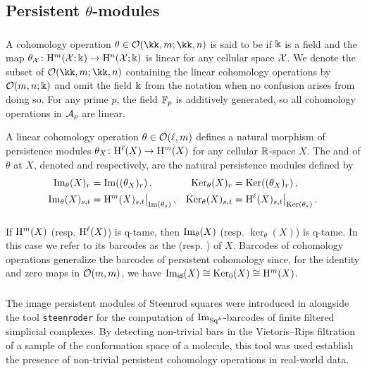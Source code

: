 
\subsection{Persistent $\theta$-modules}

\subsubsection{}\label{ss:theta-modules}

A cohomology operation $\theta \in \cO(\kk,m; \kk,n)$ is said to be  if $\Bbbk$ is a field and the map $\theta_{\mathcal{X}} \colon \mathrm{H}^m(\mathcal{X}; \Bbbk) \to \mathrm{H}^n(\mathcal{X}; \Bbbk)$ is linear for any cellular space $\mathcal{X}$.
We denote the subset of $\cO(\kk,m; \kk,n)$ containing the linear cohomology operations by $\mathcal{O}(m,n;\Bbbk)$ and omit the field \(\Bbbk\) from the notation when no confusion arises from doing so.
For any prime $p$, the field ${\mathbb{F}_p}$ is additively generated, so all cohomology operations in $\mathcal{A}_p$ are linear.

A linear cohomology operation \(\theta \in \mathcal{O}(\ell,m)\) defines a natural morphism of persistence modules $\theta_X \colon \mathrm{H}^\ell(X) \to \mathrm{H}^m(X)$ for any cellular $\mathbb{R}$-space $X$.
The  and  of $\theta$ at \(X\), denoted  and  respectively, are the natural persistence modules defined by
\begin{align*}
	\operatorname{Im}_\theta(X)_r &= \operatorname{Im}((\theta_X)_r)\,, &
	\operatorname{Ker}_\theta(X)_r &= \operatorname{Ker}((\theta_X)_r)\,, \\
	\operatorname{Im}_\theta(X)_{s,t} &= \mathrm{H}^m(X)_{s,t}\big|_{\operatorname{Im}(\theta_s)}\,, &
	\operatorname{Ker}_\theta(X)_{s,t} &= \mathrm{H}^\ell(X)_{s,t}\big|_{\operatorname{Ker}(\theta_s)}\,.
\end{align*}

\subsubsection{}\label{ss:theta-modules-q-tame}

If $\mathrm{H}^m(X)$ (resp. \(\mathrm{H}^\ell(X)\)) is q-tame, then $\operatorname{Im}_\theta(X)$ (resp. $\ker_\theta(X)$) is q-tame.
In this case we refer to its barcodes as the  (resp. ) of \(X\).
Barcodes of cohomology operations generalize the barcodes of persistent cohomology since, for the identity and zero maps in $\mathcal{O}(m,m)$, we have $\operatorname{Im}_{\mathsf{id}}(X) \cong \operatorname{Ker}_0(X) \cong \mathrm{H}^m(X)$.

\subsubsection{}

The image persistent modules of Steenrod squares were introduced in \cite{medina2022per_st} alongside the tool \texttt{steenroder} for the computation of \(\operatorname{Im}_{\mathrm{Sq}^k}\)-barcodes of finite filtered simplicial complexes.
By detecting non-trivial bars in the Vietoris--Rips filtration of a sample of the conformation space of a molecule, this tool was used establish the presence of non-trivial persistent cohomology operations in real-world data.